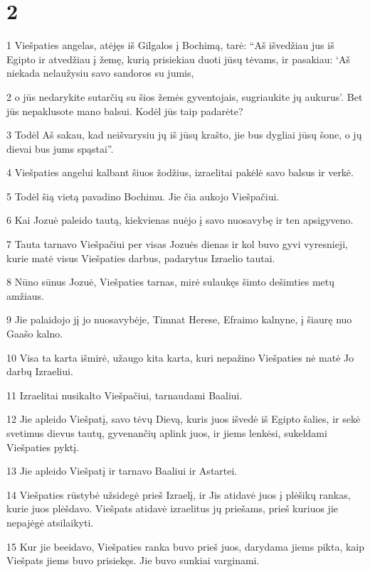 \chapter{2}

\par 1 Viešpaties angelas, atėjęs iš Gilgalos į Bochimą, tarė: “Aš išvedžiau jus iš Egipto ir atvedžiau į žemę, kurią prisiekiau duoti jūsų tėvams, ir pasakiau: ‘Aš niekada nelaužysiu savo sandoros su jumis, 
\par 2 o jūs nedarykite sutarčių su šios žemės gyventojais, sugriaukite jų aukurus’. Bet jūs nepaklusote mano balsui. Kodėl jūs taip padarėte? 
\par 3 Todėl Aš sakau, kad neišvarysiu jų iš jūsų krašto, jie bus dygliai jūsų šone, o jų dievai bus jums spąstai”. 
\par 4 Viešpaties angelui kalbant šiuos žodžius, izraelitai pakėlė savo balsus ir verkė. 
\par 5 Todėl šią vietą pavadino Bochimu. Jie čia aukojo Viešpačiui. 
\par 6 Kai Jozuė paleido tautą, kiekvienas nuėjo į savo nuosavybę ir ten apsigyveno. 
\par 7 Tauta tarnavo Viešpačiui per visas Jozuės dienas ir kol buvo gyvi vyresnieji, kurie matė visus Viešpaties darbus, padarytus Izraelio tautai. 
\par 8 Nūno sūnus Jozuė, Viešpaties tarnas, mirė sulaukęs šimto dešimties metų amžiaus. 
\par 9 Jie palaidojo jį jo nuosavybėje, Timnat Herese, Efraimo kalnyne, į šiaurę nuo Gaašo kalno. 
\par 10 Visa ta karta išmirė, užaugo kita karta, kuri nepažino Viešpaties nė matė Jo darbų Izraeliui. 
\par 11 Izraelitai nusikalto Viešpačiui, tarnaudami Baaliui. 
\par 12 Jie apleido Viešpatį, savo tėvų Dievą, kuris juos išvedė iš Egipto šalies, ir sekė svetimus dievus tautų, gyvenančių aplink juos, ir jiems lenkėsi, sukeldami Viešpaties pyktį. 
\par 13 Jie apleido Viešpatį ir tarnavo Baaliui ir Astartei. 
\par 14 Viešpaties rūstybė užsidegė prieš Izraelį, ir Jis atidavė juos į plėšikų rankas, kurie juos plėšdavo. Viešpats atidavė izraelitus jų priešams, prieš kuriuos jie nepajėgė atsilaikyti. 
\par 15 Kur jie beeidavo, Viešpaties ranka buvo prieš juos, darydama jiems pikta, kaip Viešpats jiems buvo prisiekęs. Jie buvo sunkiai varginami. 
